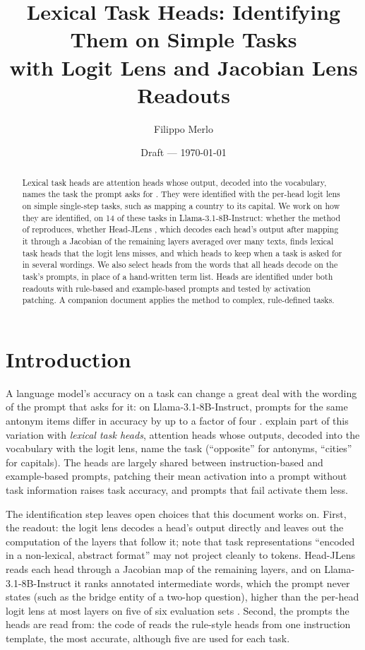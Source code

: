 \documentclass[11pt,a4paper]{article}
\title{Lexical Task Heads: Identifying Them on Simple Tasks\\ with Logit Lens and Jacobian Lens Readouts}
\author{Filippo Merlo}
\date{Draft --- \today}
\begin{document}
\maketitle

\begin{abstract}
\label{sec:abstract}
Lexical task heads are attention heads whose output, decoded into the vocabulary, names the task the prompt asks for \citep{yang2026shared}. They were identified with the per-head logit lens on simple single-step tasks, such as mapping a country to its capital. We work on how they are identified, on 14 of these tasks in Llama-3.1-8B-Instruct: whether the method of \citet{yang2026shared} reproduces, whether Head-JLens \citep{merlo2026headjlens}, which decodes each head's output after mapping it through a Jacobian of the remaining layers averaged over many texts, finds lexical task heads that the logit lens misses, and which heads to keep when a task is asked for in several wordings. We also select heads from the words that all heads decode on the task's prompts, in place of a hand-written term list. Heads are identified under both readouts with rule-based and example-based prompts and tested by activation patching. A companion document applies the method to complex, rule-defined tasks.
\end{abstract}

\section{Introduction}\label{sec:intro}
A language model's accuracy on a task can change a great deal with the wording of the prompt that asks for it: on Llama-3.1-8B-Instruct, prompts for the same antonym items differ in accuracy by up to a factor of four \citep[Fig.~1]{yang2026shared}. \citet{yang2026shared} explain part of this variation with \emph{lexical task heads}, attention heads whose outputs, decoded into the vocabulary with the logit lens, name the task (``opposite'' for antonyms, ``cities'' for capitals). The heads are largely shared between instruction-based and example-based prompts, patching their mean activation into a prompt without task information raises task accuracy, and prompts that fail activate them less.

The identification step leaves open choices that this document works on. First, the readout: the logit lens decodes a head's output directly and leaves out the computation of the layers that follow it; \citet[Sec.~4]{yang2026shared} note that task representations ``encoded in a non-lexical, abstract format'' may not project cleanly to tokens. Head-JLens reads each head through a Jacobian map of the remaining layers, and on Llama-3.1-8B-Instruct it ranks annotated intermediate words, which the prompt never states (such as the bridge entity of a two-hop question), higher than the per-head logit lens at most layers on five of six evaluation sets \citep[Sec.~3]{merlo2026headjlens}. Second, the prompts the heads are read from: the code of \citet{yang2026shared} reads the rule-style heads from one instruction template, the most accurate, although five are used for each task.
\end{document}
